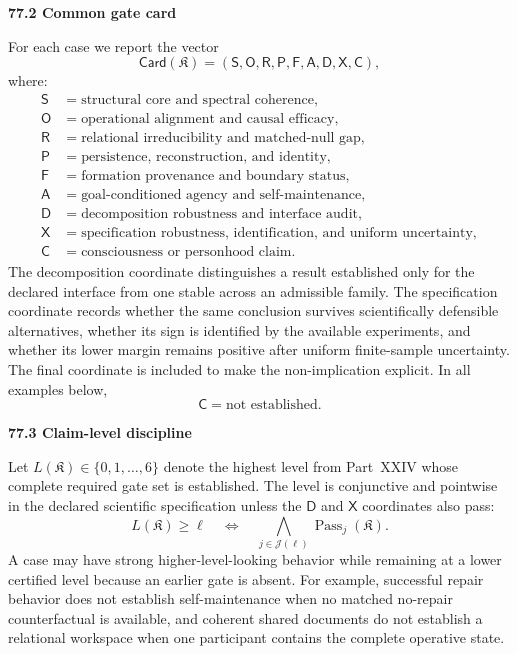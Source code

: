 \documentclass[11pt,letterpaper]{article}
\newcommand{\Pass}{\operatorname{Pass}}
\newcommand{\subtopic}[1]{%
 \vspace{0.45em}
 {\bfseries\color{AccentColor} #1\par}
}
\theoremstyle{plain}
\theoremstyle{definition}
\begin{document}
\subtopic{77.2 Common gate card}

For each case we report the vector
\[
\boxed{
\mathsf{Card}(\mathfrak K)
=
\left(
\mathsf S,
\mathsf O,
\mathsf R,
\mathsf P,
\mathsf F,
\mathsf A,
\mathsf D,
\mathsf X,
\mathsf C
\right),
}
\]
where:
\[
\begin{array}{ll}
\mathsf S & = \text{structural core and spectral coherence},\\
\mathsf O & = \text{operational alignment and causal efficacy},\\
\mathsf R & = \text{relational irreducibility and matched-null gap},\\
\mathsf P & = \text{persistence, reconstruction, and identity},\\
\mathsf F & = \text{formation provenance and boundary status},\\
\mathsf A & = \text{goal-conditioned agency and self-maintenance},\\
\mathsf D & = \text{decomposition robustness and interface audit},\\
\mathsf X & = \text{specification robustness, identification, and uniform uncertainty},\\
\mathsf C & = \text{consciousness or personhood claim}.
\end{array}
\]
The decomposition coordinate distinguishes a result established only for the
declared interface from one stable across an admissible family. The
specification coordinate records whether the same conclusion survives
scientifically defensible alternatives, whether its sign is identified by the
available experiments, and whether its lower margin remains positive after
uniform finite-sample uncertainty. The final coordinate is included to make
the non-implication explicit. In all examples below,
\[
\mathsf C=\text{not established}.
\]

\subtopic{77.3 Claim-level discipline}

Let \(L(\mathfrak K)\in\{0,1,\ldots,6\}\) denote the highest level from
Part~XXIV whose complete required gate set is established. The level is
conjunctive and pointwise in the declared scientific specification unless the
\(\mathsf D\) and \(\mathsf X\) coordinates also pass:
\[
L(\mathfrak K)\geq \ell
\quad\Longleftrightarrow\quad
\bigwedge_{j\in\mathcal J(\ell)}\Pass_j(\mathfrak K).
\]
A case may have strong higher-level-looking behavior while remaining at a lower
certified level because an earlier gate is absent. For example, successful
repair behavior does not establish self-maintenance when no matched no-repair
counterfactual is available, and coherent shared documents do not establish a
relational workspace when one participant contains the complete operative
state.
\end{document}
